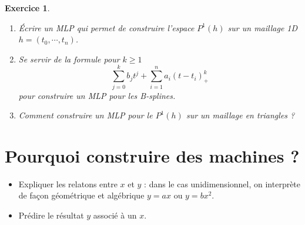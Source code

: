 \documentclass[11pt,a4paper, french]{article}
\newtheorem{exercise}[theorem]{Exercice}
\begin{document}
\begin{exercise}\label{exercise:}
\begin{enumerate}
\item Écrire un MLP qui permet de construire l'espace $P^1(h)$ sur un maillage 1D $h=(t_0,\cdots, t_n)$.
\item Se servir de la formule pour $k\ge 1$
%
\begin{equation}\label{equation:}
\sum_{j=0}^k b_j t^j + \sum_{i=1}^n a_i (t-t_i)^k_+
\end{equation}
%
pour construire un MLP pour les B-splines.
%
\item Comment construire un MLP pour le $P^1(h)$ sur un maillage en triangles ?
\end{enumerate}
\end{exercise}
%
\section{Pourquoi construire des machines ?}\label{sec:}
%
\begin{itemize}
\item Expliquer les relatons entre $x$ et $y$ : dans le cas unidimensionnel, on interprète de façon géométrique et algébrique $y=a x$ ou $y=bx^2$.
\item Prédire le résultat $y$ associé à un $x$.
\end{itemize}
%
\end{document}
